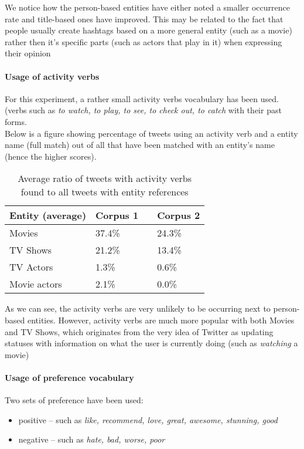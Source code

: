 We notice how the person-based entities have either noted a smaller
occurrence rate and title-based ones have improved. This may be related to the
fact that people usually create hashtags based on a more general entity (such as
a movie) rather then it's specific parts (such as actors that play in it)
when expressing their opinion \cite{edinburg-corpus}

\paragraph{Usage of activity verbs}
For this experiment, a rather small activity verbs vocabulary has been used. (verbs such
as \textit{to watch, to play, to see, to check out, to catch} with their past forms.
\\ Below is a figure showing percentage of tweets using an activity verb
and a entity name (full match) out of all that have been matched with an
entity's name (hence the higher scores).


\begin{table}[h!]
  \begin{center}
    \begin{tabular}{ | p{4cm} | p{2cm} | p{1cm}| p{2cm} | } \hline
      Entity (average) & Corpus 1 & & Corpus 2 \\ \hline
      Movies & 37.4\% & & 24.3\% \\ \hline
      TV Shows & 21.2\% & & 13.4\% \\ \hline
      TV Actors & 1.3\% & & 0.6\% \\ \hline
      Movie actors & 2.1\% & & 0.0\% \\ \hline
    \end{tabular}
    \caption{Average ratio of tweets with activity verbs found to all tweets with entity references}
  \end{center}
\end{table}


As we can see, the activity verbs are very unlikely to be occurring next to
person-based entities. However, activity verbs are much more popular with both
Movies and TV Shows, which originates from the very idea of Twitter as
updating statuses with information on what the user is currently doing (such as \textit{watching}
a movie)

\paragraph{Usage of preference vocabulary}
Two sets of preference have been used:
\begin{itemize}
  \item positive -- such as \textit{like, recommend, love, great, awesome, stunning, good}
  \item negative -- such as \textit{hate, bad, worse, poor}
\end{itemize}

